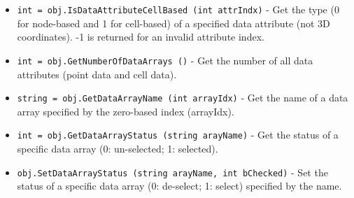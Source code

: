 \begin{itemize}
\item  \verb|int = obj.IsDataAttributeCellBased (int attrIndx)| -  Get the type (0 for node-based and 1 for cell-based) of a specified data 
 attribute (not 3D coordinates). -1 is returned for an invalid attribute
 index.

\item  \verb|int = obj.GetNumberOfDataArrays ()| -  Get the number of all data attributes (point data and cell data).

\item  \verb|string = obj.GetDataArrayName (int arrayIdx)| -  Get the name of a data array specified by the zero-based index (arrayIdx).

\item  \verb|int = obj.GetDataArrayStatus (string arayName)| -  Get the status of a specific data array (0: un-selected; 1: selected).

\item  \verb|obj.SetDataArrayStatus (string arayName, int bChecked)| -  Set the status of a specific data array (0: de-select; 1: select) specified
 by the name.

\end{itemize}
